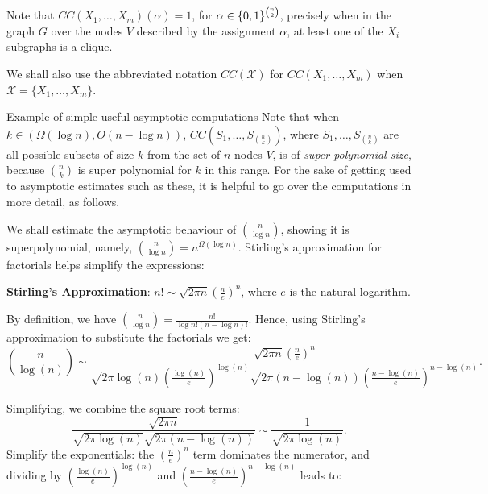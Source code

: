 Note that $CC\left(X_1, \ldots, X_m\right)(\alpha)=1$, for $\alpha\in\{0,1\}^{n\choose 2}$, precisely when in the graph $G$ over the nodes $V$ described by the assignment $\alpha$, at least one of the $X_i$ subgraphs is a clique. 

We shall also use the abbreviated notation $CC(\mathcal X)$ for $CC(X_1,\dots,X_m)$ when $\mathcal X = \{X_1,\dots,X_m\}$.


\begin{trailer}{Example of simple useful asymptotic computations}
Note that when $k\in(\Omega(\log n),O(n-\log n))$, $CC\left(S_1, \ldots, S_{n\choose k}\right)$, where $S_1,\dots,S_{n\choose k}$ are all possible subsets of size $k$ from the set of $n$ nodes $V$, is of \emph{super-polynomial size}, because $ n\choose k$ is super polynomial for $k$ in this range. For the sake of getting used to asymptotic estimates such as these, it is helpful to go over the computations in more detail, as follows.

We shall estimate the asymptotic behaviour of $\binom{n}{\log n} $, showing it is superpolynomial, namely, $\binom{n}{\log n} =
n^{\Omega(\log n)}$. Stirling's approximation for factorials helps simplify the expressions: 
\begin{tcolorbox}[colframe=white, colback=gray!5, boxrule=0mm, sharp corners]
\textbf{Stirling's Approximation}:
$n!\sim \sqrt{2 \pi n}\left(\frac{n}{e}\right)^n$, where $e$ is the natural logarithm.
\end{tcolorbox}

By definition, we have $\binom{n}{\log n} =\frac{n!}{\log n!(n-\log n)!}$. Hence, using Stirling's approximation to substitute the factorials we get:
\[
 \binom{n}{\log(n)} \sim \frac{\sqrt{2 \pi n} \left(\frac{n}{e}\right)^n}{\sqrt{2 \pi \log(n)} \left(\frac{\log(n)}{e}\right)^{\log(n)} \sqrt{2 \pi (n - \log(n))} \left(\frac{n - \log(n)}{e}\right)^{n - \log(n)}}.
\]
 
Simplifying, we combine the square root terms:
   \[
   \frac{\sqrt{2 \pi n}}{\sqrt{2 \pi \log(n)} \sqrt{2 \pi (n - \log(n))}} \sim \frac{1}{\sqrt{2 \pi \log(n)}}.
   \]
Simplify the exponentials:    the \(\left(\frac{n}{e}\right)^n\) term dominates the numerator, and dividing by \(\left(\frac{\log(n)}{e}\right)^{\log(n)}\) and \(\left(\frac{n - \log(n)}{e}\right)^{n - \log(n)}\) leads to:


\end{trailer}
